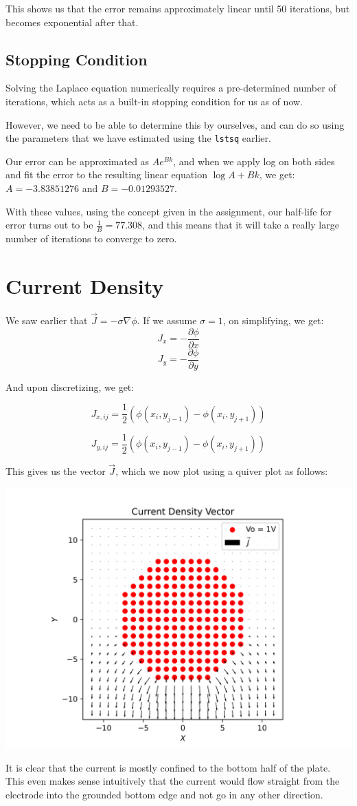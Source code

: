 \documentclass[12pt]{article}
\begin{document}
This shows us that the error remains approximately linear until 50 iterations, but becomes exponential after that.

\subsection{Stopping Condition}
Solving the Laplace equation numerically requires a pre-determined number of iterations, which acts as a built-in stopping condition for us as of now.

However, we need to be able to determine this by ourselves, and can do so using the parameters that we have estimated using the \texttt{lstsq} earlier.

Our error can be approximated as $Ae^{Bk}$, and when we apply log on both sides and fit the error to the resulting linear equation $\log{A} + B k$, we get:
$A = -3.83851276$ and $B = -0.01293527 $.

With these values, using the concept given in the assignment, our half-life for error turns out to be $\frac{1}{B} = 77.308$, and this means that it will take a really large number of iterations to converge to zero.
\pagebreak
\section{Current Density}

We saw earlier that $\vec{J} = -\sigma \nabla \phi$. If we assume $\sigma=1$, on simplifying, we get:
$$J_x = -\frac{\partial \phi}{\partial x}$$
$$J_y = -\frac{\partial \phi}{\partial y}$$

And upon discretizing, we get:

$$J_{x,ij} = \frac{1}{2}(\phi(x_{i},y_{j-1})-\phi(x_{i},y_{j+1}))$$

$$J_{y,ij} = \frac{1}{2}(\phi(x_{i},y_{j-1})-\phi(x_{i},y_{j+1}))$$

This gives us the vector $\vec{J}$, which we now plot using a quiver plot as follows:
\begin{center}
    \includegraphics{images/fig6.png}
\end{center}
It is clear that the current is mostly confined to the bottom half of the plate. 
This even makes sense intuitively that the current would flow straight from the electrode into the grounded bottom edge and not go in any other direction.
\pagebreak
\end{document}
